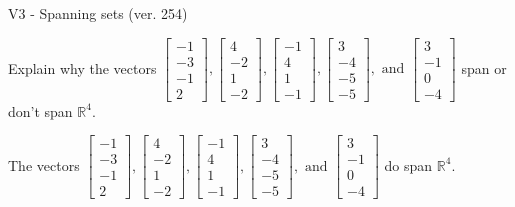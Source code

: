 \begin{exercise}
  \begin{exerciseTitle}V3 - Spanning sets (ver. 254)\end{exerciseTitle}
  \begin{exerciseStatement}
    Explain why the vectors \(\left[\begin{array}{r}
-1 \\
-3 \\
-1 \\
2
\end{array}\right] , \left[\begin{array}{r}
4 \\
-2 \\
1 \\
-2
\end{array}\right] , \left[\begin{array}{r}
-1 \\
4 \\
1 \\
-1
\end{array}\right] , \left[\begin{array}{r}
3 \\
-4 \\
-5 \\
-5
\end{array}\right] , \text{ and } \left[\begin{array}{r}
3 \\
-1 \\
0 \\
-4
\end{array}\right]\) span or don't span \(\mathbb{R}^4\). 
	


  \end{exerciseStatement}
  \begin{exerciseAnswer}
   The vectors \(\left[\begin{array}{r}
-1 \\
-3 \\
-1 \\
2
\end{array}\right] , \left[\begin{array}{r}
4 \\
-2 \\
1 \\
-2
\end{array}\right] , \left[\begin{array}{r}
-1 \\
4 \\
1 \\
-1
\end{array}\right] , \left[\begin{array}{r}
3 \\
-4 \\
-5 \\
-5
\end{array}\right] , \text{ and } \left[\begin{array}{r}
3 \\
-1 \\
0 \\
-4
\end{array}\right]\) 
  	 do  
	span \(\mathbb{R}^4\).
  



\end{exerciseAnswer}
\end{exercise}
